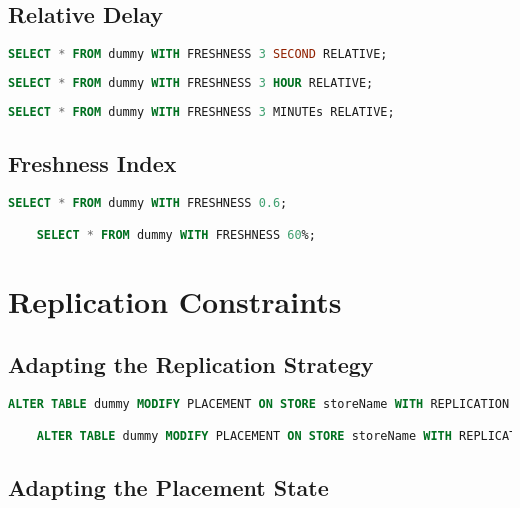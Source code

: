\tocless\subsection{Relative Delay}

\begin{lstlisting}[language=sql]
    SELECT * FROM dummy WITH FRESHNESS 3 SECOND RELATIVE;
\end{lstlisting}

\begin{lstlisting}[language=sql]
    SELECT * FROM dummy WITH FRESHNESS 3 HOUR RELATIVE;
\end{lstlisting}

\begin{lstlisting}[language=sql]
    SELECT * FROM dummy WITH FRESHNESS 3 MINUTEs RELATIVE;
\end{lstlisting}



\tocless\subsection{Freshness Index}

\begin{lstlisting}[language=sql]
    SELECT * FROM dummy WITH FRESHNESS 0.6;

    SELECT * FROM dummy WITH FRESHNESS 60%;
\end{lstlisting}


\tocless\section{Replication Constraints}

\tocless\subsection{Adapting the Replication Strategy}

\begin{lstlisting}[language=sql]
    ALTER TABLE dummy MODIFY PLACEMENT ON STORE storeName WITH REPLICATION EAGER;

    ALTER TABLE dummy MODIFY PLACEMENT ON STORE storeName WITH REPLICATION LAZY;
\end{lstlisting}


\tocless\subsection{Adapting the Placement State}

